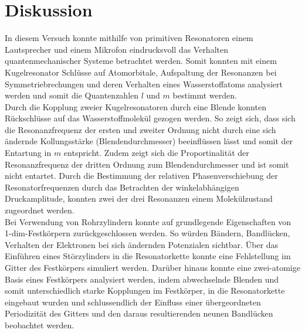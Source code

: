 \section{Diskussion}
In diesem Versuch konnte mithilfe von primitiven Resonatoren einem Lautsprecher und
einem Mikrofon eindrucksvoll das Verhalten quantenmechanischer Systeme betrachtet werden.
Somit konnten mit einem Kugelresonator Schlüsse auf Atomorbitale, Aufspaltung der Resonanzen bei Symmetriebrechungen und deren Verhalten eines
Wasserstoffatoms analysiert werden und somit die Quantenzahlen $l$ und $m$ bestimmt werden.\\
Durch die Kopplung zweier Kugelresonatoren durch eine Blende konnten Rückschlüsse auf das Wasserstoffmolekül gezogen werden.
So zeigt sich, dass sich die Resonanzfrequenz der ersten und zweiter Ordnung nicht durch eine sich ändernde Kollungsstärke (Blendendurchmesser)
beeinflüssen lässt und somit der Entartung in $m$ entspricht. Zudem zeigt sich die Proportinalität
der Resonanzfrequenz der dritten Ordnung zum Blendendurchmesser und ist somit nicht entartet.
Durch die Bestimmung der relativen Phasenverschiebung der Resonatorfrequenzen durch das Betrachten der winkelabhängigen Druckamplitude, konnten zwei der drei Resonanzen
einem Molekülzustand zugeordnet werden.\\
Bei Verwendung von Rohrzylindern konnte auf grundlegende Eigenschaften von 1-dim-Festkörpern zurückgeschlossen werden. So würden Bändern, Bandlücken,
Verhalten der Elektronen bei sich ändernden Potenzialen sichtbar. Über das Einführen eines Störzylinders
in die Resonatorkette konnte eine Fehlstellung im Gitter des Festkörpers simuliert werden. Darüber hinaus konnte
eine zwei-atomige Basis eines Festkörpers analysiert werden, indem abwechselnde Blenden und somit unterschiedlich starke Kopplungen im Festkörper,
in die Resonatorkette eingebaut wurden und schlussendlich der Einfluss einer übergeordneten Periodizität
des Gitters und den daraus resultierenden neunen Bandlücken beobachtet werden.
\label{sec:Diskussion}